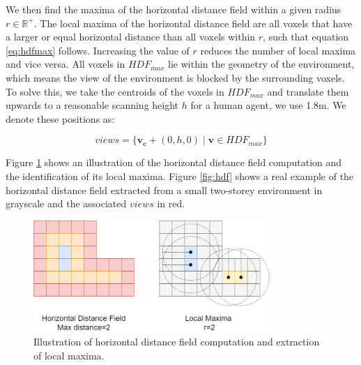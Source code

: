 We then find the maxima of the horizontal distance field within a given radius \(r \in \mathbb{R}^+\).  The local maxima of the horizontal distance field are all voxels that have a larger or equal horizontal distance than all voxels within \(r\), such that equation \ref{eq:hdfmax} follows. Increasing the value of \(r\) reduces the number of local maxima and vice versa. All voxels in \(HDF_{max}\) lie within the geometry of the environment, which means the view of the environment is blocked by the surrounding voxels. To solve this, we take the centroids of the voxels in \(HDF_{max}\) and translate them upwards to a reasonable scanning height \(h\) for a human agent, we use 1.8m. We denote these positions as:

\begin{equation}
    \label{eq:views}
views = \{\boldsymbol{v_c} + (0, h, 0) \mid \boldsymbol{v} \in HDF_{max}\}
\end{equation}

Figure \ref{fig:hdf_simple} shows an illustration of the horizontal distance field computation and the identification of its local maxima. Figure \ref{fig:hdf} shows a real example of the horizontal distance field extracted from a small two-storey environment in grayscale and the associated \(views\) in red.

\begin{figure}[h]
    \centering
    \includegraphics*[width=0.8\textwidth]{./fig/hdf_simple.png}
    \caption{Illustration of horizontal distance field computation and extraction of local maxima.}
    \label{fig:hdf_simple}
\end{figure}

